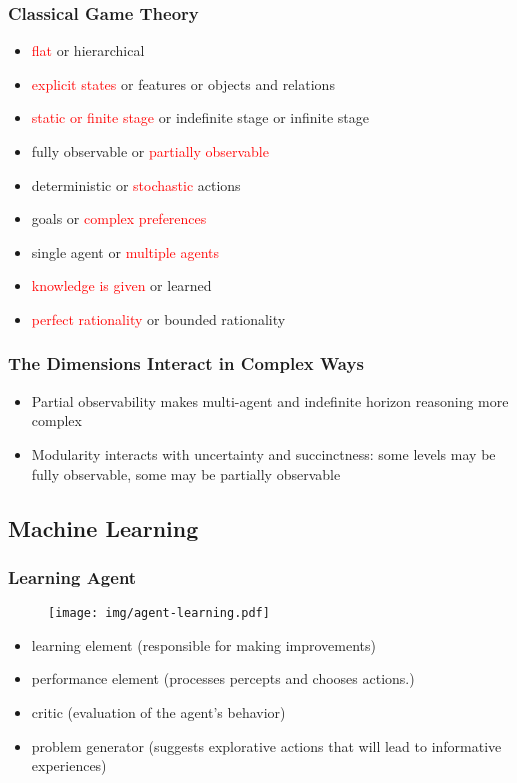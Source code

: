 \documentclass[UTF8,11pt,colorlinks,compress,openany]{beamer}%
\begin{document}
\begin{frame}\frametitle{Classical Game Theory}
\begin{itemize}
	\item \textcolor{red}{flat} or hierarchical
	\item \textcolor{red}{explicit states} or features or objects and relations
	\item \textcolor{red}{static or finite stage} or indefinite stage or infinite stage
	\item fully observable or \textcolor{red}{partially observable}
	\item deterministic or \textcolor{red}{stochastic} actions
	\item goals or \textcolor{red}{complex preferences}
	\item single agent or \textcolor{red}{multiple agents}
	\item \textcolor{red}{knowledge is given} or learned
	\item \textcolor{red}{perfect rationality} or bounded rationality
\end{itemize}
\end{frame}

\begin{frame}\frametitle{The Dimensions Interact in Complex Ways}
\begin{itemize}
	\item Partial observability makes multi-agent and indefinite horizon reasoning more complex
	\item Modularity interacts with uncertainty and succinctness:	some levels may be fully observable, some may be partially observable
\end{itemize}
\end{frame}

\subsection{Machine Learning}

\begin{frame}\frametitle{Learning Agent}
\vspace*{-1ex}
\begin{figure}[H]
	\texttt{[image: img/agent-learning.pdf]}
\end{figure}
\begin{itemize}
	\item learning element (responsible for making improvements)
	\item performance element (processes percepts and chooses actions.)
	\item critic (evaluation of the agent's behavior)
	\item problem generator (suggests explorative actions that will lead to informative experiences)
\end{itemize}
\end{frame}
\end{document}
